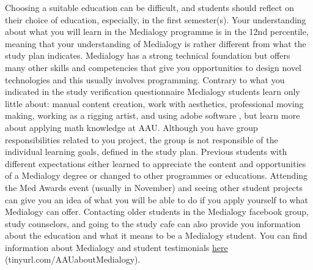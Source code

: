 \documentclass[]{article}
\begin{document}
Choosing a suitable education can be difficult, and students should
reflect on their choice of education, especially, in the first
semester(s). Your understanding about what you will learn in the
Medialogy programme is in the 12nd percentile, meaning that your
understanding of Medialogy is rather different from what the study plan
indicates. Medialogy has a strong technical foundation but offers many
other skills and competencies that give you opportunities to design
novel technologies and this usually involves programming. Contrary to
what you indicated in the study verification questionnaire Medialogy
students learn only little about: manual content creation, work with
aesthetics, professional moving making, working as a rigging artist, and
using adobe software , but learn more about applying math knowledge at
AAU. Although you have group responsibilities related to you project,
the group is not responsible of the individual learning goals, defined
in the study plan. Previous students with different expectations either
learned to appreciate the content and opportunities of a Medialogy
degree or changed to other programmes or educations. Attending the Med
Awards event (usually in November) and seeing other student projects can
give you an idea of what you will be able to do if you apply yourself to
what Medialogy can offer. Contacting older students in the Medialogy
facebook group, study counselors, and going to the study cafe can also
provide you information about the education and what it means to be a
Medialogy student. You can find information about Medialogy and student
testimonials \href{tinyurl.com/AAUaboutMedialogy}{here}
(tinyurl.com/AAUaboutMedialogy).
\end{document}

